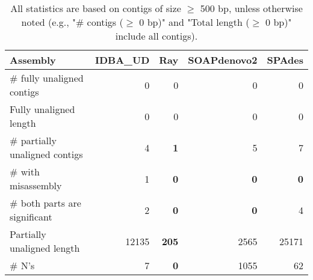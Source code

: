 \documentclass[12pt,a4paper]{article}
\begin{document}
\begin{table}[ht]
\begin{center}
\caption{All statistics are based on contigs of size $\geq$ 500 bp, unless otherwise noted (e.g., "\# contigs ($\geq$ 0 bp)" and "Total length ($\geq$ 0 bp)" include all contigs).}
\begin{tabular}{|l*{4}{|r}|}
\hline
Assembly & IDBA\_UD & Ray & SOAPdenovo2 & SPAdes \\ \hline
\# fully unaligned contigs & 0 & 0 & 0 & 0 \\ \hline
Fully unaligned length & 0 & 0 & 0 & 0 \\ \hline
\# partially unaligned contigs & 4 & {\bf 1} & 5 & 7 \\ \hline
\hspace{5mm}\# with misassembly & 1 & {\bf 0} & {\bf 0} & {\bf 0} \\ \hline
\hspace{5mm}\# both parts are significant & 2 & {\bf 0} & {\bf 0} & 4 \\ \hline
Partially unaligned length & 12135 & {\bf 205} & 2565 & 25171 \\ \hline
\# N's & 7 & {\bf 0} & 1055 & 62 \\ \hline
\end{tabular}
\end{center}
\end{table}
\end{document}
